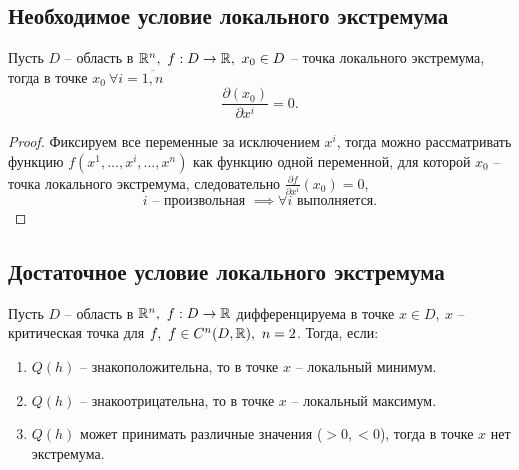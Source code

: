 \setcounter{subsection}{11}

\subsection{Необходимое условие локального экстремума}

\begin{theorem}
    Пусть $D$ -- область в $ \mathbb{R}^n, \ f:D \rightarrow\mathbb{R}, \ x_0 \in D $ -- точка локального экстремума, тогда в точке $ x_0 \ \forall i = \overline{1,n}$
    \[
        \frac{\partial(x_0)}{\partial x^i} = 0.
    \]
\end{theorem}

\begin{proof}
    Фиксируем все переменные за исключением $ x^i $, тогда можно рассматривать функцию $ f(x^1,\ldots,x^i,\ldots,x^n) $ как функцию одной переменной, для которой $ x_0 $ -- точка локального экстремума, следовательно $ \frac{\partial f}{\partial x^i}(x_0) = 0 $,
    \[
        i \text{ -- произвольная }\implies \forall i \text{ выполняется}.
    \]
\end{proof}

\setcounter{subsection}{13}

\subsection{Достаточное условие локального экстремума}

\begin{theorem}
    Пусть $D$ -- область в $\mathbb{R}^n, \ f: D \rightarrow \mathbb{R}$ дифференцируема в точке $x \in D, \ x$ -- критическая точка для $f, \ f \in C^n(D,\mathbb{R}), \ n = 2$. Тогда, если:
    \begin{enumerate}
        \item $Q(h)$ -- знакоположительна, то в точке $x$ -- локальный минимум.
        \item $Q(h)$ -- знакоотрицательна, то в точке $x$ -- локальный максимум.
        \item $Q(h)$ может принимать различные значения ($>0, < 0$), тогда в точке $x$ нет экстремума.
    \end{enumerate}
\end{theorem}

